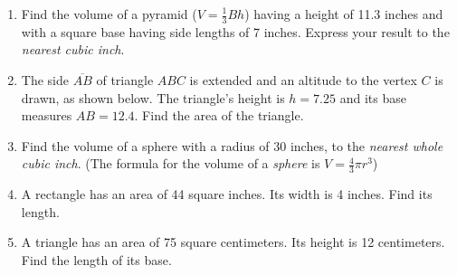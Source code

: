 \documentclass[12pt, twoside]{article}
\begin{document}
\begin{enumerate}
\newpage
\item Find the volume of a pyramid ($V=\frac{1}{3}Bh$) having a height of 11.3 inches and with a square base having side lengths of 7 inches. Express your result to the \emph{nearest cubic inch}. \vspace{3cm}

\item The side $\overline{AB}$ of triangle $ABC$ is extended and an altitude to the vertex $C$ is drawn, as shown below. The triangle's height is $h=7.25$ and its base measures $AB=12.4$. Find the area of the triangle.\\[0.25cm]

\item Find the volume of a sphere with a radius of 30 inches, to the \emph{nearest whole cubic inch}. (The formula for the volume of a \emph{sphere} is $V=\frac{4}{3}\pi r^3$) \vspace{3cm}

\item A rectangle has an area of 44 square inches. Its width is 4 inches. Find its length.
 \vspace{2.0cm}

\item A triangle has an area of 75 square centimeters. Its height is 12 centimeters. Find the length of its base.
\end{enumerate}
\end{document}
